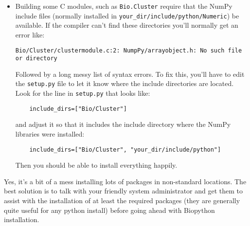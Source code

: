 \documentclass{article}
\begin{document}
\begin{itemize}

  \item Building some C modules, such as \verb|Bio.Cluster| require that 
    the NumPy include files (normally installed in
    \verb|your_dir/include/python/Numeric|) be available. If the
    compiler can't find these directories you'll normally get an error
    like:

    \begin{verbatim}
Bio/Cluster/clustermodule.c:2: NumpPy/arrayobject.h: No such file or directory
    \end{verbatim}

    Followed by a long messy list of syntax errors. To fix this, you'll
    have to edit the \verb|setup.py| file to let it know where the
    include directories are located. Look for the line in
    \verb|setup.py| that looks like:

    \begin{verbatim}
    include_dirs=["Bio/Cluster"]
    \end{verbatim}

    and adjust it so that it includes the include directory where the
    NumPy libraries were installed:
    
    \begin{verbatim}
    include_dirs=["Bio/Cluster", "your_dir/include/python"]
    \end{verbatim}

    Then you should be able to install everything happily.

\end{itemize}

Yes, it's a bit of a mess installing lots of packages in non-standard
locations. The best solution is to talk with your friendly system
administrator and get them to assist with the installation of at least
the required packages (they are generally quite useful for any python
install) before going ahead with Biopython installation.
\end{document}
